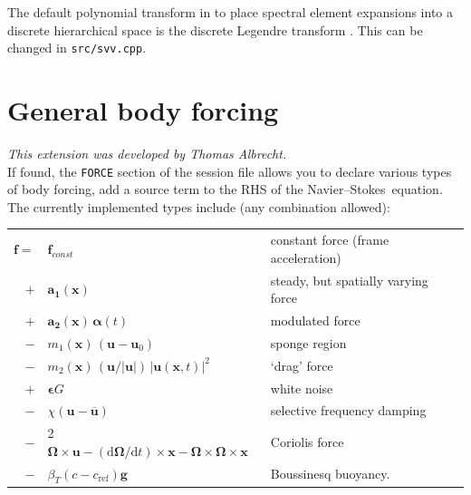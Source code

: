 \documentclass[11pt]{report}
\newcommand\cd{\mathrm{d}} \newcommand\cD{\mathrm{D}}
\newcommand\NavSto{Navier--Stokes}
\begin{document}
The default polynomial transform in to place spectral element
expansions into a discrete hierarchical space is the discrete Legendre
transform \citep[see e.g.][]{blsc03}. This can be changed in
\verb|src/svv.cpp|.


\section{General body forcing}
\label{sec.dns_ff}

\textsl{This extension was developed by Thomas Albrecht.}\\

\noindent
If found, the \verb+FORCE+ section of the session file allows you to
declare various types of body forcing, \ie add a source term
to the RHS of the \NavSto\ equation. The currently implemented types
include (any combination allowed):\\[1em]
\begin{tabular}{rll}
 $ \bm{f} =$ & $\bm{f}_{const}$                           
  & constant force (frame acceleration)\\
           $+$ & $\bm{a_1}(\bm{x})$                       
  & steady, but spatially varying force\\
           $+$ & $\bm{a_2}(\bm{x}) \, \bm{\alpha}(t) $ 
  & modulated force\\
           $-$ & $m_1(\bm{x})\,(\bm{u} - \bm{u}_0)$  
  & sponge region\\
           $-$ & $m_2(\bm{x})\,(\bm{u}/|\bm{u}|)\,|\bm{u}(\bm{x}, t)|^2$  
  & `drag' force  \\
           $+$ & $\bm{\epsilon} G$                        
  & white noise    \\
           $-$ & $\chi(\bm{u}-\overline{\bm{u}})$
  & selective frequency damping \\
           $-$ & 2 $\bm{\Omega} \times \bm{u} - 
                    (\cd\bm{\Omega}/\cd t) \times \bm{x} -
                    \bm{\Omega} \times \bm{\Omega} \times \bm{x}$  
  & Coriolis force \\
           $-$ & $\beta_T(c-c_\textrm{ref})\bm{g}$
  & Boussinesq buoyancy.                
\end{tabular}\\[1em]

\end{document}
